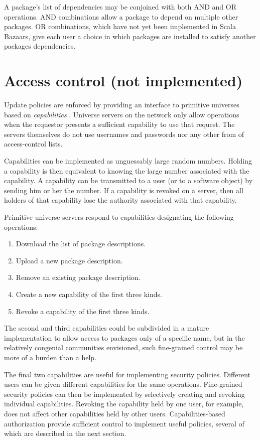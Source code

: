 \documentclass{article}
\begin{document}
A package's list of dependencies may be conjoined with both AND and OR
operations.  AND combinations allow a package to depend on multiple
other packages.  OR combinations, which have not yet been implemented
in Scala Bazaars, give each user a choice in which packages are
installed to satisfy another packages dependencies.


\section{Access control (not implemented)}
Update policies are enforced by providing an interface to primitive
universes based on \emph{capabilities} \cite{miller00:caps}.  Universe
servers on the network only allow operations when the requestor
presents a sufficient capability to use that request.  The servers
themselves do not use usernames and passwords nor any other from of
access-control lists.

Capabilities can be implemented as unguessably large random numbers.
Holding a capability is then equivalent to knowing the large number
associated with the capability.  A capability can be transmitted to a
user (or to a software object) by sending him or her the number.  If a
capability is revoked on a server, then all holders of that capability
lose the authority associated with that capability.


Primitive universe servers respond to capabilities designating the
following operations:
\begin{enumerate}
\item Download the list of package descriptions.
\item Upload a new package description.
\item Remove an existing package description.
\item Create a new capability of the first three kinds.
\item Revoke a capability of the first three kinds.
\end{enumerate}
The second and third capabilities could be subdivided in a mature
implementation to allow access to packages only of a specific name,
but in the relatively congenial communities envisioned, such
fine-grained control may be more of a burden than a help.


The final two capabilities are useful for implementing security
policies.  Different users can be given different capabilities for the
same operations.  Fine-grained security policies can then be implemented by
selectively creating and revoking individual capabilities.  Revoking
the capability held by one user, for example, does not affect other
capabilities held by other users.
Capabilities-based authorization provide sufficient control to
implement useful policies, several of which are described in the next
section.
\end{document}
